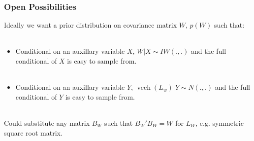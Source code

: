 \documentclass[xcolor=dvipsnames]{beamer}
\DeclareMathOperator{\vech}{vech}
\begin{document}
\begin{frame}
\frametitle{Open Possibilities}
Ideally we want a prior distribution on covariance matrix $W$, $p(W)$ such that:\\~\\
\begin{itemize}
\item Conditional on an auxillary variable $X$, $W|X \sim IW(.,.)$ and the full conditional of $X$ is easy to sample from.\\~\\
\item Conditional on an auxillary variable $Y$, $\vech(L_w)|Y \sim N(.,.)$ and the full conditional of $Y$ is easy to sample from.\\~\\
\end{itemize}
\pause Could substitute any matrix $B_W$ such that $B_W'B_W=W$ for $L_W$, e.g. symmetric square root matrix.
\end{frame}




\end{document}
